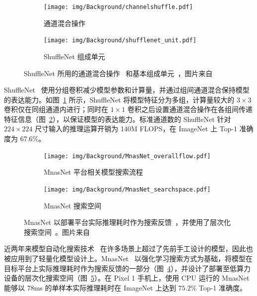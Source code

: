 \documentclass[
  fontset = mac,
]{shtthesis}
\begin{document}
\begin{figure}[htb]
  \centering
  \begin{subfigure}[t]{0.45\columnwidth}
    \centering
    \texttt{[image: img/Background/channelshuffle.pdf]}
    \caption{通道混合操作}
    \label{img::background::channel_shuffle}
  \end{subfigure}
  \quad
  \begin{subfigure}[t]{0.45\columnwidth}
    \centering
    \texttt{[image: img/Background/shufflenet\_unit.pdf]}
    \caption{ShuffleNet 组成单元}
    \label{img::background::shufflenet_unit}
  \end{subfigure}
  \caption{ShuffleNet 所用的通道混合操作~ 和基本组成单元~，图片来自~\citet{zhang2018shufflenet}}
  \label{img::background::shuffle_net}
\end{figure}

ShuffleNet~\citep{zhang2018shufflenet} 使用分组卷积减少模型参数和计算量，并通过组间通道混合保持模型的表达能力。如图~\ref{img::background::channel_shuffle} 所示，ShuffleNet 将模型特征分为多组，计算量较大的 $3\times 3$ 卷积仅在同组通道内进行；同时在 $1 \times 1$ 卷积之后设置通道混合操作在各组间传递特征信息（图~\ref{img::background::shufflenet_unit}），以保证模型的表达能力。标准通道数的 ShuffleNet 针对 $224\times 224$ 尺寸输入的推理运算开销为 140M FLOPS，在 ImageNet 上 Top-1 准确度为 $67.6\%$。

\begin{figure}[htb]
  \centering
  \begin{subfigure}[t]{0.35\columnwidth}
    \centering
    \texttt{[image: img/Background/MnasNet\_overallflow.pdf]}
    \caption{MnasNet 平台相关模型搜索流程}
    \label{img::background::mnasnet_overall_flow}
  \end{subfigure}
  \quad
  \begin{subfigure}[t]{0.6\columnwidth}
    \centering
    \texttt{[image: img/Background/MnasNet\_searchspace.pdf]}
    \caption{MnasNet 搜索空间}
    \label{img::background::mnasnet_search_space}
  \end{subfigure}
  \caption{MnasNet 以部署平台实际推理耗时作为搜索反馈~，并使用了层次化搜索空间~。图片来自~\citet{tan2019mnasnet}}
  \label{img::background::mnasnet}
\end{figure}

近两年来模型自动化搜索技术~\citep{zoph2018learning, liu2018darts, lu2019nsga} 在许多场景上超过了先前手工设计的模型，因此也被应用到了轻量化模型设计上。MnasNet~\citep{tan2019mnasnet} 以强化学习搜索方式为基础，将模型在目标平台上实际推理耗时作为搜索反馈的一部分（图~\ref{img::background::mnasnet_overall_flow}），并设计了部署至低算力设备的层次化搜索空间（图~\ref{img::background::mnasnet_search_space}）。在 Pixel 1 手机上，使用 CPU 运行的 MnasNet 能够以 78ms 的单样本实际推理耗时在 ImageNet 上达到 $75.2\%$ Top-1 准确度。
\end{document}
